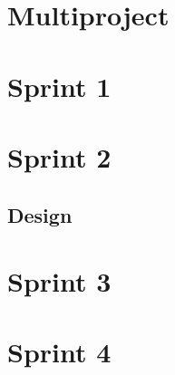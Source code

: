 \chapter{Multiproject}

\chapter{Sprint 1}

\newpage




















\chapter{Sprint 2}


\newpage




\section{Design}











\chapter{Sprint 3}





\chapter{Sprint 4}


